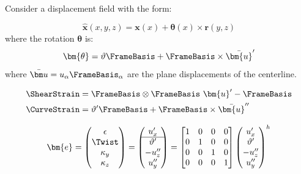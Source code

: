 Consider a displacement field with the form:

\begin{equation*}
\hat{\bm{x}}(x,y,z)=\bm{x}(x)+\bm{\theta}(x) \times \bm{r}(y,z)
\end{equation*}
where the rotation \(\bm\theta\) is:
\begin{equation}
\bm{\theta} = \vartheta \FrameBasis  + \FrameBasis \times \bar{\bm{u}}^{\prime}
\end{equation}
where \(\bar{\bm u} = u_\alpha\FrameBasis_{\alpha}\) are the plane displacements of the centerline.

\begin{equation}
\begin{aligned}
\ShearStrain &= \FrameBasis \otimes\FrameBasis  ~ \bm{u}^{\prime} - \FrameBasis  \\
\CurveStrain &= \vartheta^{\prime} \FrameBasis  + \FrameBasis \times\bar{\bm{u}}^{\prime\prime}
\end{aligned}
\label{eq:basic-euler-strains}
\end{equation}

$$
\bm{e}
= \begin{pmatrix}
    \epsilon \\ 
    \Twist \\ 
    \kappa_y \\ 
    \kappa_z
  \end{pmatrix}
= \begin{pmatrix} 
 u_{x}^{\prime} \\ \hline 
 \vartheta^{\prime} \\ 
-u_z^{\prime\prime} \\ 
 u_y^{\prime\prime} \\
\end{pmatrix} 
= \begin{bmatrix}
1 &  0 &  0 & 0 \\
0 &  1 &  0 & 0 \\
0 &  0 &  1 & 0 \\
0 &  0 &  0 & 1 \\
\end{bmatrix}
\begin{pmatrix}
 u_x^{\prime} \\ 
 \vartheta^{\prime} \\
-u_z^{\prime\prime} \\ 
 u_y^{\prime\prime} \\ 
\end{pmatrix}^h 
$$

